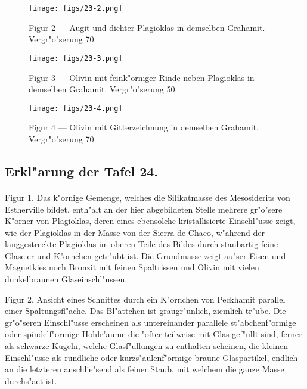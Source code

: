 \documentclass[a4paper, 11pt, oneside, polutonikogreek, german]{article}
\begin{document}
\vspace*{\fill}
\begin{figure}[H]
\centering
\texttt{[image: figs/23-2.png]}
\caption{\small Figur 2 --- Augit und dichter Plagioklas in demselben Grahamit. Vergr"o"serung 70.}
\end{figure}
\vspace*{\fill}
\clearpage

\vspace*{\fill}
\begin{figure}[H]
\centering
\texttt{[image: figs/23-3.png]}
\caption{\small Figur 3 --- Olivin mit feink"orniger Rinde neben Plagioklas in demselben Grahamit. Vergr"o"serung 50.}
\end{figure}
\vspace*{\fill}
\clearpage

\vspace*{\fill}
\begin{figure}[H]
\centering
\texttt{[image: figs/23-4.png]}
\caption{\small Figur 4 --- Olivin mit Gitterzeichnung in demselben Grahamit. Vergr"o"serung 70.}
\end{figure}
\vspace*{\fill}
\clearpage

\subsection{Erkl"arung der Tafel 24.}
\paragraph{}
Figur 1. Das k"ornige Gemenge, welches die Silikatmasse des Mesosiderits von Estherville bildet, enth"alt an der hier abgebildeten Stelle mehrere gr"o"sere K"orner von Plagioklas, deren eines ebensolche kristallisierte Einschl"usse zeigt, wie der Plagioklas in der Masse von der Sierra de Chaco, w"ahrend der langgestreckte Plagioklas im oberen Teile des Bildes durch staubartig feine Glaseier und K"ornchen getr"ubt ist. Die Grundmasse zeigt au"ser Eisen und Magnetkies noch Bronzit mit feinen Spaltrissen und Olivin mit vielen dunkelbraunen Glaseinschl"ussen.

Figur 2. Ansicht eines Schnittes durch ein K"ornchen von Peckhamit parallel einer Spaltungsfl"ache. Das Bl"attchen ist graugr"unlich, ziemlich tr"ube. Die gr"o"seren Einschl"usse erscheinen als untereinander parallele st"abchenf"ormige oder spindelf"ormige Hohlr"aume die "ofter teilweise mit Glas gef"ullt sind, ferner als schwarze Kugeln, welche Glasf"ullungen zu enthalten scheinen, die kleinen Einschl"usse als rundliche oder kurzs"aulenf"ormige braune Glaspartikel, endlich an die letzteren anschlie"send als feiner Staub, mit welchem die ganze Masse durchs"aet ist.
\end{document}
